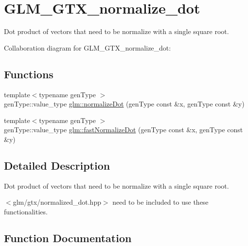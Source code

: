 \hypertarget{group__gtx__normalize__dot}{}\section{G\+L\+M\+\_\+\+G\+T\+X\+\_\+normalize\+\_\+dot}
\label{group__gtx__normalize__dot}


Dot product of vectors that need to be normalize with a single square root.  


Collaboration diagram for G\+L\+M\+\_\+\+G\+T\+X\+\_\+normalize\+\_\+dot\+:
\subsection*{Functions}
\begin{DoxyCompactItemize}
\item 
{\footnotesize template$<$typename gen\+Type $>$ }\\gen\+Type\+::value\+\_\+type \hyperlink{group__gtx__normalize__dot_ga52c7583d03b57632e26fc88495117c95}{glm\+::normalize\+Dot} (gen\+Type const \&x, gen\+Type const \&y)
\item 
{\footnotesize template$<$typename gen\+Type $>$ }\\gen\+Type\+::value\+\_\+type \hyperlink{group__gtx__normalize__dot_ga1b122b5e630204d309e42f16d4823cef}{glm\+::fast\+Normalize\+Dot} (gen\+Type const \&x, gen\+Type const \&y)
\end{DoxyCompactItemize}


\subsection{Detailed Description}
Dot product of vectors that need to be normalize with a single square root. 

$<$glm/gtx/normalized\+\_\+dot.\+hpp$>$ need to be included to use these functionalities. 

\subsection{Function Documentation}
\hypertarget{group__gtx__normalize__dot_ga1b122b5e630204d309e42f16d4823cef}{}
